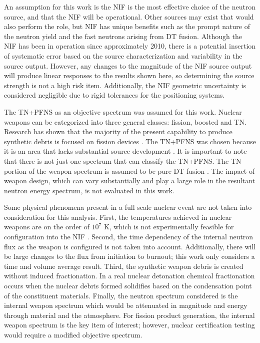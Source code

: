 An assumption for this work is the NIF is the most effective choice of the neutron source, and that the NIF will be operational. 
Other sources may exist that would also perform the role, but NIF has unique benefits such as the prompt nature of the neutron yield and the fast neutrons arising from DT fusion. 
Although the NIF has been in operation since approximately 2010, there is a potential insertion of systematic error based on the source characterization and variability in the source output. However, any changes to the magnitude of the NIF source output will produce linear responses to the results shown here, so determining the source strength is not a high risk item.  
Additionally, the NIF geometric uncertainty is considered negligible due to rigid tolerances for the positioning systems.  

The TN+PFNS as an objective spectrum was assumed for this work. 
Nuclear weapons can be categorized into three general classes: fission, boosted and TN\cite{Bridgman,Mctl}. 
Research has shown that the majority of the present capability to produce synthetic debris is focused on fission devices \cite{Bevins}. 
The TN+PFNS was chosen because it is an area that lacks substantial source development \cite{Bevins}. 
It is important to note that there is not just one spectrum that can classify the TN+PFNS. 
The TN portion of the weapon spectrum is assumed to be pure DT fusion \cite{Mctl}. 
The impact of weapon design, which can vary substantially and play a large role in the resultant neutron energy spectrum, is not evaluated in this work. 

Some physical phenomena present in a full scale nuclear event are not taken into consideration for this analysis. 
First, the temperatures achieved in nuclear weapons are on the order of $10^{7}$ K, which is not experimentally feasible for configuration into the NIF \cite{Glasstone1977}. 
Second, the time dependency of the internal neutron flux as the weapon is configured is not taken into account. 
Additionally, there will be large changes to the flux from initiation to burnout;  this work only considers a time and volume average result. 
Third, the synthetic weapon debris is created without induced fractionation.  In a real nuclear detonation chemical fractionation occurs when the nuclear debris formed solidifies based on the condensation point of the constituent materials. 
Finally, the neutron spectrum considered is the internal weapon spectrum which would be attenuated in magnitude and energy through material and the atmosphere. 
For fission product generation, the internal weapon spectrum is the key item of interest; however, nuclear certification testing would require a modified objective spectrum. 

